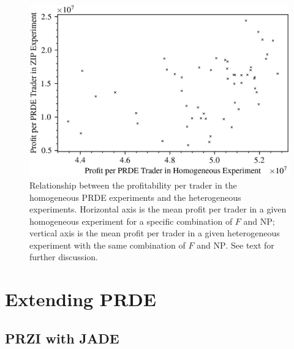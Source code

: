 \documentclass[conference]{IEEEtran}
\begin{document}
\begin{figure}[htbp]
    \centerline{\includegraphics[width=\columnwidth]{homo_zip_scatter.png}}
    \caption{
        Relationship between the profitability per trader in the homogeneous PRDE experiments and the heterogeneous experiments.
        Horizontal axis is the mean profit per trader in a given homogeneous experiment for a specific combination of $F$ and $\mathrm{NP}$; vertical axis is the mean profit per trader in a given heterogeneous experiment with the same combination of $F$ and $\mathrm{NP}$.
        See text for further discussion.
    }
    \label{homo_zip_scatter}
\end{figure}

\section{Extending PRDE}

\subsection{PRZI with JADE}
\end{document}
